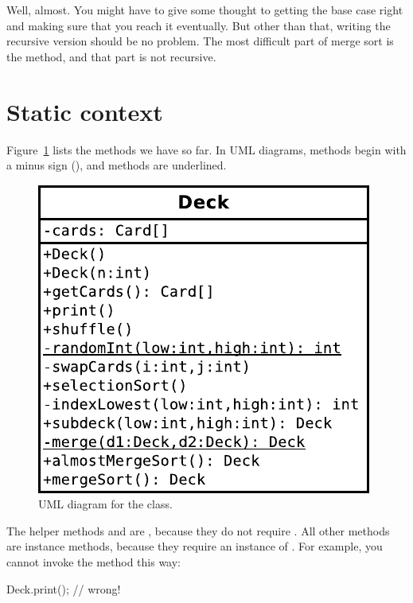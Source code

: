 Well, almost.
You might have to give some thought to getting the base case right and making sure that you reach it eventually.
But other than that, writing the recursive version should be no problem.
The most difficult part of merge sort is the  method, and that part is not recursive.


\section{Static context}

Figure~\ref{fig.deck} lists the  methods we have so far.
In UML diagrams,  methods begin with a minus sign (\java{-}), and  methods are underlined.


\begin{figure}[!ht]
\begin{center}
\includegraphics{figs/deck.pdf}
\caption{UML diagram for the  class.}
\label{fig.deck}
\end{center}
\end{figure}

The helper methods  and  are , because they do not require .
All other methods are instance methods, because they require an instance of .
For example, you cannot invoke the  method this way:

\begin{code}
Deck.print();  // wrong!
\end{code}

